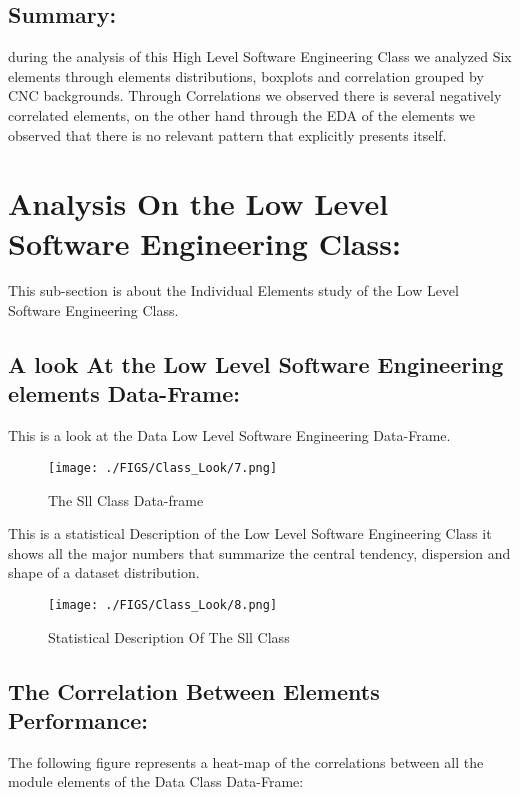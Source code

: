 \documentclass[12pt]{extreport}
\begin{document}
\subsection{Summary:}
during the analysis of this High Level Software Engineering Class we analyzed Six elements through elements distributions, boxplots and correlation grouped by CNC backgrounds. Through Correlations we observed there is several negatively correlated elements, on the other hand through the EDA of the elements we observed that there is no relevant pattern that explicitly presents itself.



\section{Analysis On the Low Level Software Engineering  Class:}

This sub-section is about the Individual Elements study of the Low Level Software Engineering Class. 

\subsection{A look At the Low Level Software Engineering elements Data-Frame:}



This is a look at the Data Low Level Software Engineering Data-Frame.
\begin{figure}[H]
	\centering
	\texttt{[image: ./FIGS/Class\_Look/7.png]}
	\caption{The Sll Class Data-frame}
	\label{fig:1}
\end{figure}



This is a statistical Description of the Low Level Software Engineering Class it shows all the major numbers that summarize the central tendency, dispersion and shape of a dataset distribution.

\begin{figure}[H]
	\centering
	\texttt{[image: ./FIGS/Class\_Look/8.png]}
	\caption{Statistical Description Of The Sll Class}
	\label{fig:58}
\end{figure}

\subsection{The Correlation Between Elements Performance:}

The following figure represents a heat-map of the correlations between all the module elements of the Data Class Data-Frame:
\end{document}

